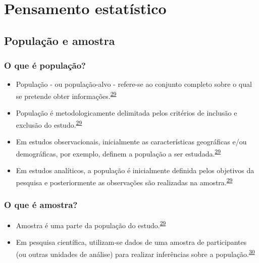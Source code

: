 \documentclass[
  a4paper,
]{book}
\begin{document}
\hypertarget{pensamento-estatistico}{%
\chapter{\texorpdfstring{\textbf{Pensamento estatístico}}{Pensamento estatístico}}\label{pensamento-estatistico}}

\hypertarget{populacao-amostra}{%
\section{População e amostra}\label{populacao-amostra}}

\hypertarget{o-que-uxe9-populauxe7uxe3o}{%
\subsection{O que é população?}\label{o-que-uxe9-populauxe7uxe3o}}

\begin{itemize}
\item
  População - ou população-alvo - refere-se ao conjunto completo sobre o qual se pretende obter informações.\textsuperscript{\protect\hyperlink{ref-Banerjee2010}{29}}
\item
  População é metodologicamente delimitada pelos critérios de inclusão e exclusão do estudo.\textsuperscript{\protect\hyperlink{ref-Banerjee2010}{29}}
\item
  Em estudos observacionais, inicialmente as características geográficas e/ou demográficas, por exemplo, definem a população a ser estudada.\textsuperscript{\protect\hyperlink{ref-Banerjee2010}{29}}
\item
  Em estudos analíticos, a população é inicialmente definida pelos objetivos da pesquisa e posteriormente as observações são realizadas na amostra.\textsuperscript{\protect\hyperlink{ref-Banerjee2010}{29}}
\end{itemize}

\hypertarget{o-que-uxe9-amostra}{%
\subsection{O que é amostra?}\label{o-que-uxe9-amostra}}

\begin{itemize}
\item
  Amostra é uma parte da população do estudo.\textsuperscript{\protect\hyperlink{ref-Banerjee2010}{29}}
\item
  Em pesquisa científica, utilizam-se dados de uma amostra de participantes (ou outras unidades de análise) para realizar inferências sobre a população.\textsuperscript{\protect\hyperlink{ref-Bland2015}{30}}
\end{itemize}
\end{document}
